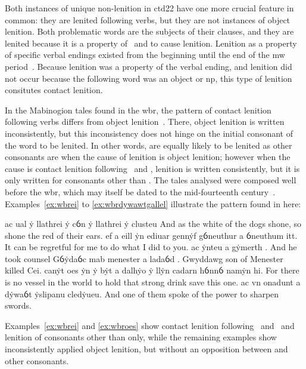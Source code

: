 Both instances of unique non-lenition in \gls{ctd22} have one more crucial feature in common: they are lenited following verbs, but they are not instances of object lenition. Both problematic words are the subjects of their clauses, and they are lenited because it is a property of \ei\ and  to cause lenition. Lenition as a property of specific verbal endings existed from the beginning until the end of the \gls{mw} period~\autocite[42]{van_development14}. Because lenition was a property of the verbal ending, and lenition did not occur because the following word was an object or \gls{np}, this type of lenition consitutes contact lenition.

In the Mabinogion tales found in the \gls{wbr}, the pattern of contact lenition following verbs differs from object lenition~\autocite[42, 69--70]{van_development14}. There, object lenition is written inconsistently, but this inconsistency does not hinge on the initial consonant of the word to be lenited. In other words,  are equally likely to be lenited  as other consonants are when the cause of lenition is object lenition; however when the cause is contact lenition following \ei\ and \oes, lenition is written consistently, but it is only written for consonants other than . The tales analysed were composed well before the \gls{wbr}, which may itself be dated to the mid-fourteenth century~\autocite[228]{huws_medieval_2000}. Examples~\ref{ex:wbrei} to \ref{ex:wbrdywawtgallel} illustrate the pattern found in here:
\begin{mwl}
  {ac ual ẏ llathrei  ẏ cỽn ẏ llathrei  ẏ clusteu}%
  {And as the white of the dogs shone, so shone the red of their ears.}%
  {ef a eill  ẏn ediuar gennẏf gỽneuthur a ỽneuthum itt.}%
  {It can be regretful for me to do what I did to you.}
  {ac ẏnteu a gẏmerth .}%
  {And he took counsel}
  {Gỽẏdaỽc mab menester a ladaỽd .}%
  {Gwyddawg son of Menester killed Cei.}
  {canẏt oes  ẏn ẏ bẏt a dalhẏo ẏ llẏn cadarn hỽnnỽ namẏn hi.}%
  {For there is no vessel in the world to hold that strong drink save this one.}%
  {ac vn onadunt a dẏwaỽt  ẏslipanu cledẏueu.}%
  {And one of them spoke of the power to sharpen swords.}
\end{mwl}
Examples~\ref{ex:wbrei} and \ref{ex:wbroes} show contact lenition following \ei\ and \oes\ and lenition of consonants other than  only, while the remaining examples show inconsistently applied object lenition, but without an opposition between  and other consonants.


